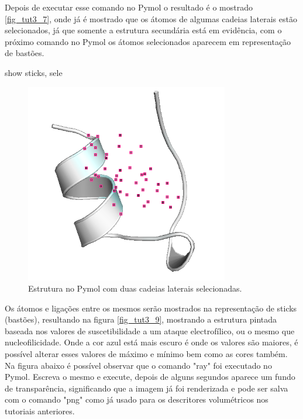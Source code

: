 \documentclass[a4paper,11pt]{refart}
\begin{document}
Depois de executar esse comando no Pymol o resultado é o mostrado \autoref{fig_tut3_7}, onde já é mostrado que os átomos de algumas cadeias laterais estão selecionados, já que somente a estrutura secundária está em evidência, com o próximo comando no Pymol os átomos selecionados aparecem em representação de bastões.

\hspace*{-\leftmarginwidth}
\begin{minipage}{\fullwidth}
	\begin{pymol}show sticks, sele\end{pymol}
\end{minipage}

\hspace*{-\leftmarginwidth}
\begin{minipage}{\fullwidth}
	\begin{figure}[H]
		\begin{center}
			\includegraphics[width=3.5in]{images/tut3_img9}
			\caption{Estrutura no Pymol com duas cadeias laterais selecionadas.}
			\label{fig_tut3_7}
		\end{center}
	\end{figure}
\end{minipage}

Os átomos e ligações entre os mesmos serão mostrados na representação de sticks (bastões), resultando na figura \autoref{fig_tut3_9}, mostrando a estrutura pintada baseada nos valores de suscetibilidade a um ataque electrofílico, ou o mesmo que nucleofilicidade. Onde a cor azul está mais escuro é onde os valores são maiores, é possível alterar esses valores de máximo e mínimo bem como as cores também. Na figura abaixo é possível observar que o comando "ray" foi executado no Pymol. Escreva o mesmo e execute, depois de alguns segundos aparece um fundo de  transparência, significando que a imagem já foi renderizada e pode ser salva com o comando "png" como já usado para os descritores volumétricos nos tutoriais anteriores. 
\end{document}
